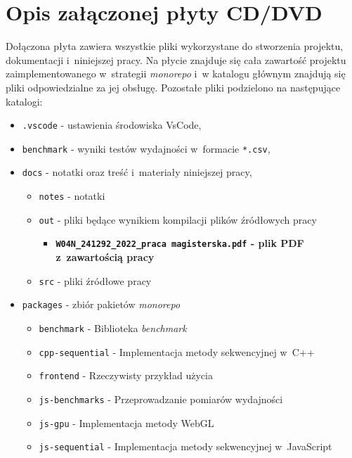 \chapter{Opis załączonej płyty CD/DVD}
Dołączona płyta zawiera wszystkie pliki wykorzystane do stworzenia projektu, dokumentacji i~niniejszej pracy. Na płycie znajduje się cała zawartość projektu zaimplementowanego w~strategii \textit{monorepo} i~w katalogu głównym znajdują się pliki odpowiedzialne za jej obsługę.  Pozostałe pliki podzielono na następujące katalogi:

\begin{itemize}
    \item \texttt{.vscode} - ustawienia środowiska VsCode,
    \item \texttt{benchmark} - wyniki testów wydajności w~formacie \texttt{*.csv},
    \item \texttt{docs} - notatki oraz treść i~materiały niniejszej pracy,
    \begin{itemize}[topsep=0pt]
        \item[\textbullet] \texttt{notes} - notatki
        \item[\textbullet] \texttt{out} - pliki będące wynikiem kompilacji plików źródłowych pracy
        \begin{itemize}[topsep=0pt]
            \item[\textbullet] \textbf{\texttt{W04N\_241292\_2022\_praca magisterska.pdf} - plik PDF z~zawartością pracy}
        \end{itemize}
        \item[\textbullet] \texttt{src} - pliki źródłowe pracy
    \end{itemize} 
    \item \texttt{packages} - zbiór pakietów \textit{monorepo}
    \begin{itemize}[topsep=0pt]
        \item[\textbullet] \texttt{benchmark} - Biblioteka \textit{benchmark}
        \item[\textbullet] \texttt{cpp-sequential} - Implementacja metody sekwencyjnej w~C++
        \item[\textbullet] \texttt{frontend} - Rzeczywisty przykład użycia
        \item[\textbullet] \texttt{js-benchmarks} - Przeprowadzanie pomiarów wydajności
        \item[\textbullet] \texttt{js-gpu} - Implementacja metody WebGL
        \item[\textbullet] \texttt{js-sequential} - Implementacja metody sekwencyjnej w~JavaScript

\end{itemize}
\end{itemize}
